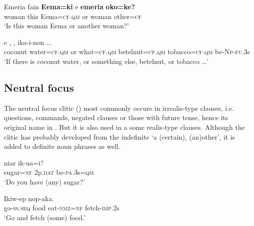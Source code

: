 \ea%
\label{ex:9:x1718}
\gll Emeria  fain  \textbf{Eema=ki} e  \textbf{emeria} \textbf{oko=ke?}\\
woman  this  Eema=\textsc{cf}.\textsc{qm}  or  woman  other=\textsc{cf}\\
\glt`Is this woman Eema or another woman?'
\z


\ea%
\label{ex:9:x1717}
\gll {}     e  ,  ,   ika-i-non  ...\\
coconut  water=\textsc{cf}.\textsc{qm}  or  what=\textsc{cf}.\textsc{qm}  betelnut=\textsc{cf}.\textsc{qm} tobacco=\textsc{cf}.\textsc{qm}  be-\textsc{Np}-\textsc{fu}.3s     \\
\glt`If there is coconut water, or something else, betelnut, or tobacco {\dots}'
\z


\subsection{Neutral focus}  \label{sec:9.3.2}

The neutral focus clitic () most commonly occurs in irrealis-type clauses, i.e. questions, commands, negated clauses or those with future tense, hence its original name in \citet{Jarvinen1988b}. But it is also used in a some realis-type clauses. Although the clitic has probably developed from the indefinite  `a (certain), (an)other', it is added to definite noun phrases as well. 

\ea%
\label{ex:9:x1719}
\gll {}  niar  ik-ua=i? \\
sugar=\textsc{nf}  2p.\textsc{dat}  be-\textsc{pa}.3s=\textsc{qm}      \\
\glt`Do you have (any) sugar?'
\z


\ea%
\label{ex:9:x1720}
\gll Ikiw-ep     nop-aka.\\
go-\textsc{ss}.\textsc{seq}  food  eat-\textsc{nmz}=\textsc{nf}  fetch-\textsc{imp}.2s\\
\glt`Go and fetch (some) food.'
\z


